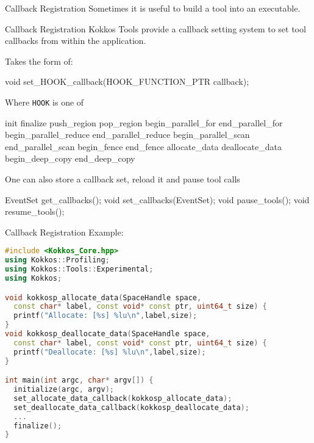 \begin{frame}[fragile]{Callback Registration}
Sometimes it is useful to build a tool into an executable.

\vspace{5pt}
\begin{block}{Callback Registration}
Kokkos Tools provide a callback setting system to set tool callbacks from within the application.
\end{block}

Takes the form of:
\begin{code}
void set_HOOK_callback(HOOK_FUNCTION_PTR callback);
\end{code}

Where \texttt{HOOK} is one of 
\begin{code}
init finalize push_region pop_region begin_parallel_for 
end_parallel_for begin_parallel_reduce end_parallel_reduce
begin_parallel_scan end_parallel_scan begin_fence end_fence
allocate_data deallocate_data begin_deep_copy end_deep_copy
\end{code}

One can also store a callback set, reload it and pause tool calls
\begin{code}
EventSet get_callbacks();  void set_callbacks(EventSet);
void pause_tools();        void resume_tools();
\end{code}
\end{frame}

\begin{frame}[fragile]{Callback Registration}
Example:
\begin{lstlisting}[language=C++]
#include <Kokkos_Core.hpp>
using Kokkos::Profiling;
using Kokkos::Tools::Experimental;
using Kokkos;

void kokkosp_allocate_data(SpaceHandle space,
  const char* label, const void* const ptr, uint64_t size) {
  printf("Allocate: [%s] %lu\n",label,size);
}
void kokkosp_deallocate_data(SpaceHandle space,
  const char* label, const void* const ptr, uint64_t size) {
  printf("Deallocate: [%s] %lu\n",label,size);
}

int main(int argc, char* argv[]) {
  initialize(argc, argv);
  set_allocate_data_callback(kokkosp_allocate_data);
  set_deallocate_data_callback(kokkosp_deallocate_data);
  ...
  finalize();
}
\end{lstlisting}

\end{frame}


